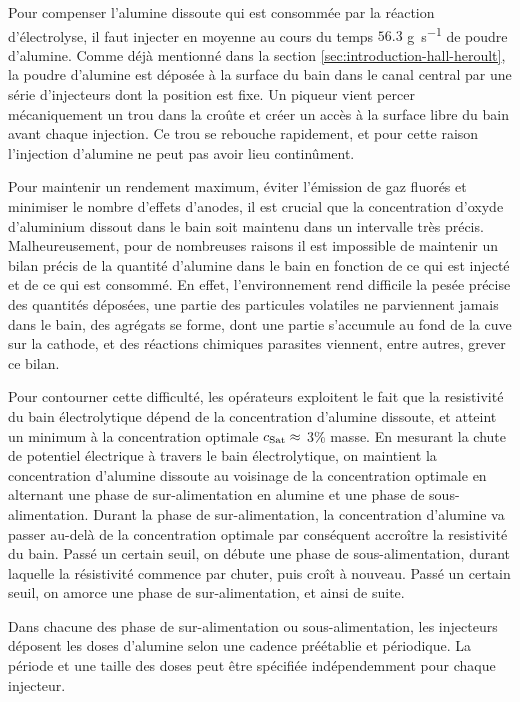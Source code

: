 Pour compenser l'alumine dissoute qui est consommée par la réaction
d'électrolyse, il faut injecter en moyenne au cours du temps $56.3$
\si{\gram\per\second} de poudre d'alumine. Comme déjà mentionné
dans la section \ref{sec:introduction-hall-heroult}, la poudre
d'alumine est déposée à la surface du bain dans le canal central par
une série d'injecteurs dont la position est fixe. Un piqueur vient
percer mécaniquement un trou dans la croûte et créer un accès à la
surface libre du bain avant chaque injection. Ce trou se rebouche
rapidement, et pour cette raison l'injection d'alumine ne peut pas
avoir lieu continûment.

Pour maintenir un rendement maximum, éviter l'émission de gaz
fluorés et minimiser le nombre d'effets d'anodes, il est crucial que
la concentration d'oxyde d'aluminium dissout dans le bain soit
maintenu dans un intervalle très précis. Malheureusement, pour de
nombreuses raisons il est impossible de maintenir un bilan précis de
la quantité d'alumine dans le bain en fonction de ce qui est injecté
et de ce qui est consommé. En effet, l'environnement rend difficile la
pesée précise des quantités déposées, une partie des particules
volatiles ne parviennent jamais dans le bain, des agrégats se forme,
dont une partie s'accumule au fond de la cuve sur la cathode, et des
réactions chimiques parasites viennent, entre autres, grever ce bilan.

Pour contourner cette difficulté, les opérateurs exploitent le fait
que la resistivité du bain électrolytique dépend de la concentration
d'alumine dissoute, et atteint un minimum à la concentration optimale
$c_\text{Sat} \approx$ \num{3}\% masse. En mesurant la chute de potentiel
électrique à travers le bain électrolytique, on maintient la
concentration d'alumine dissoute au voisinage de la concentration
optimale en alternant une phase de sur-alimentation en alumine et une
phase de sous-alimentation. Durant la phase de sur-alimentation, la
concentration d'alumine va passer au-delà de la concentration optimale
par conséquent accroître la resistivité du bain. Passé un certain
seuil, on débute une phase de sous-alimentation, durant laquelle la
résistivité commence par chuter, puis croît à nouveau. Passé un
certain seuil, on amorce une phase de sur-alimentation, et ainsi de
suite.

Dans chacune des phase de sur-alimentation ou sous-alimentation, les
injecteurs déposent les doses d'alumine selon une cadence préétablie
et périodique. La période et une taille des doses peut être spécifiée
indépendemment pour chaque injecteur.

